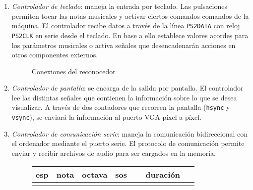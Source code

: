 \documentclass{article}
\begin{document}
\begin{enumerate}
	\item {\itshape Controlador de teclado}: maneja la entrada por teclado. Las pulsaciones permiten tocar las notas musicales y activar ciertos comandos comandos de la máquina. El controlador recibe datos a través de la línea \verb|PS2DATA| con reloj \verb|PS2CLK| en serie desde el teclado. En base a ello establece valores acordes para los parámetros musicales o activa señales que desencadenarán acciones en otros componentes externos.

\begin{figure}[ht]\centering

	\caption{Conexiones del reconocedor}
	\label{fig:reconocedor}
\end{figure}

	\item {\itshape Controlador de pantalla}: se encarga de la salida por pantalla. El controlador lee las distintas señales que contienen la información sobre lo que se desea visualizar. A través de dos contadores que recorren la pantalla (\verb|hsync| y \verb|vsync|), se enviará la información al puerto VGA píxel a píxel.
	\item {\itshape Controlador de comunicación serie}: maneja la comunicación bidireccional con el ordenador mediante el puerto serie. El protocolo de comunicación permite enviar y recibir archivos de audio para ser cargados en la memoria.

	\begin{figure}[ht] \centering
		\begin{tabular}{| l | l | l | l | l | l | l | l | l | l | l | l | l | l | l | l |}
			\hline esp & \multicolumn{3}{c|}{nota} & \multicolumn{3}{c|}{octava} & sos & \multicolumn{8}{c|}{duración} \\ \hline
			& & & & & & & & & & & & & & & \\ \hline
		\end{tabular}


\end{figure}
\end{enumerate}
\end{document}
